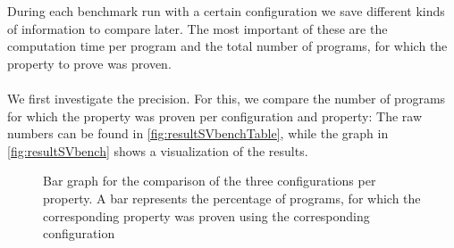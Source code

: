       During each benchmark run with a certain configuration we save different kinds of information to compare later. The most important of these are the computation time per program and the total number of programs, for which the property to prove was proven.\\
      \\
      We first investigate the precision. For this, we compare the number of programs for which the property was proven per configuration and property: The raw numbers can be found in \autoref{fig:resultSVbenchTable}, while the graph in \autoref{fig:resultSVbench} shows a visualization of the results.\\
 
      \begin{figure}[!ht]
        \centering
        \caption[Bar graph for the comparison of the three configurations per property.]{Bar graph for the comparison of the three configurations per property. A bar represents the percentage of programs, for which the corresponding property was proven using the corresponding configuration}
        \label{fig:resultSVbench}
      \end{figure}

